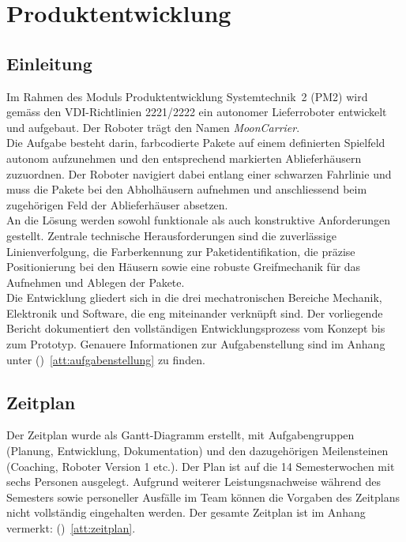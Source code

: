 \documentclass[11pt,a4paper]{article}
\begin{document}
	
	\tableofcontents
	\clearpage
	
	\section{Produktentwicklung}
	
	\subsection{Einleitung}
	Im Rahmen des Moduls Produktentwicklung Systemtechnik~2 (PM2) wird gemäss den VDI-Richtlinien 2221/2222 \cite{vdi2221} ein autonomer Lieferroboter entwickelt und aufgebaut. Der Roboter trägt den Namen \textit{MoonCarrier}.\\
	
	\noindent
	Die Aufgabe besteht darin, farbcodierte Pakete auf einem definierten Spielfeld autonom aufzunehmen und den entsprechend markierten Ablieferhäusern zuzuordnen. Der Roboter navigiert dabei entlang einer schwarzen Fahrlinie und muss die Pakete bei den Abholhäusern aufnehmen und anschliessend beim zugehörigen Feld der Ablieferhäuser absetzen.\\
	
	\noindent
	An die Lösung werden sowohl funktionale als auch konstruktive Anforderungen gestellt. Zentrale technische Herausforderungen sind die zuverlässige Linienverfolgung, die Farberkennung zur Paketidentifikation, die präzise Positionierung bei den Häusern sowie eine robuste Greifmechanik für das Aufnehmen und Ablegen der Pakete.\\
	
	\noindent
	Die Entwicklung gliedert sich in die drei mechatronischen Bereiche Mechanik, Elektronik und Software, die eng miteinander verknüpft sind. Der vorliegende Bericht dokumentiert den vollständigen Entwicklungsprozess vom Konzept bis zum Prototyp. Genauere Informationen zur Aufgabenstellung sind im Anhang unter ()~\ref{att:aufgabenstellung} zu finden.
	
	\newpage
	\subsection{Zeitplan}
	Der Zeitplan wurde als Gantt-Diagramm erstellt, mit Aufgabengruppen (Planung, Entwicklung, Dokumentation) und den dazugehörigen Meilensteinen (Coaching, Roboter Version 1 etc.). Der Plan ist auf die 14 Semesterwochen mit sechs Personen ausgelegt. Aufgrund weiterer Leistungsnachweise während des Semesters sowie personeller Ausfälle im Team können die Vorgaben des Zeitplans nicht vollständig eingehalten werden. Der gesamte Zeitplan ist im Anhang vermerkt: ()~\ref{att:zeitplan}. 
	
\end{document}
